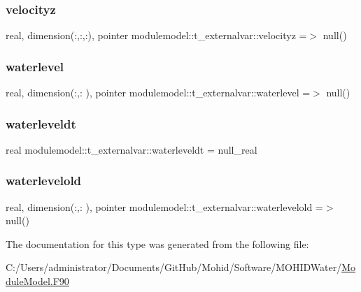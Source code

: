 \subsubsection{\texorpdfstring{velocityz}{velocityz}}
{\footnotesize\ttfamily real, dimension(\+:,\+:,\+:), pointer modulemodel\+::t\+\_\+externalvar\+::velocityz =$>$ null()\hspace{0.3cm}{\ttfamily [private]}}

\mbox{\label{structmodulemodel_1_1t__externalvar_a3b1039a681feb42500fbc9d2b2d45f89}} 
\subsubsection{\texorpdfstring{waterlevel}{waterlevel}}
{\footnotesize\ttfamily real, dimension(\+:,\+:  ), pointer modulemodel\+::t\+\_\+externalvar\+::waterlevel =$>$ null()\hspace{0.3cm}{\ttfamily [private]}}

\mbox{\label{structmodulemodel_1_1t__externalvar_a9dea39556617aa1465eec174c5add062}} 
\subsubsection{\texorpdfstring{waterleveldt}{waterleveldt}}
{\footnotesize\ttfamily real modulemodel\+::t\+\_\+externalvar\+::waterleveldt = null\+\_\+real\hspace{0.3cm}{\ttfamily [private]}}

\mbox{\label{structmodulemodel_1_1t__externalvar_aadc0f886133a0e4de14c35823b529d32}} 
\subsubsection{\texorpdfstring{waterlevelold}{waterlevelold}}
{\footnotesize\ttfamily real, dimension(\+:,\+:  ), pointer modulemodel\+::t\+\_\+externalvar\+::waterlevelold =$>$ null()\hspace{0.3cm}{\ttfamily [private]}}



The documentation for this type was generated from the following file\+:\begin{DoxyCompactItemize}
\item 
C\+:/\+Users/administrator/\+Documents/\+Git\+Hub/\+Mohid/\+Software/\+M\+O\+H\+I\+D\+Water/\mbox{\hyperlink{_module_model_8_f90}{Module\+Model.\+F90}}\end{DoxyCompactItemize}
